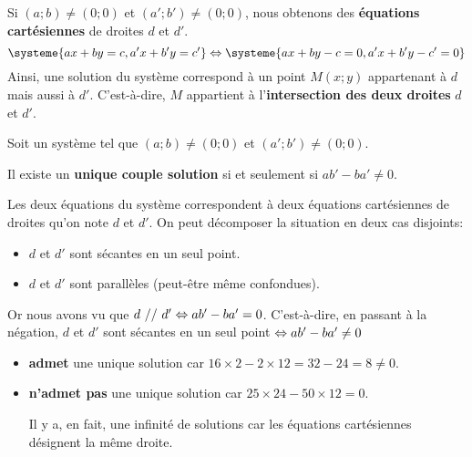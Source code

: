 \documentclass[cours,couleur]{mathsRC}
\begin{document}
\begin{remarque}
Si $(a;b)\neq(0;0)$ et $(a';b')\neq(0;0)$, nous obtenons des \textbf{équations cartésiennes} de droites $d$ et $d'$.
\[
\systeme{ax+by=c,a'x+b'y=c'} \ssi \systeme{ax+by-c=0,a'x+b'y-c'=0}
\]
Ainsi, une solution du système correspond à un point $M(x;y)$ appartenant à $d$ mais aussi à $d'$. C'est-à-dire, $M$ appartient à l'\textbf{intersection des deux droites} $d$ et $d'$.
\end{remarque}

\begin{propriete}
Soit un système  tel que $(a;b)\neq(0;0)$ et $(a';b')\neq(0;0)$.

Il existe un \textbf{unique couple solution} si et seulement si $ab'-ba'\neq0$.
\end{propriete}

\begin{demonstration}
Les deux équations du système correspondent à deux équations cartésiennes de droites qu'on note $d$ et $d'$. On peut décomposer la situation en deux cas disjoints:
\begin{itemize}
\item
$d$ et $d'$ sont sécantes en un seul point.
\item
$d$ et $d'$ sont parallèles (peut-être même confondues).
\end{itemize}
Or nous avons vu que $d\ //\ d' \Leftrightarrow ab'-ba'=0$. C'est-à-dire, en passant à la négation, $d$ et $d'$ sont sécantes en un seul point $\Leftrightarrow ab'-ba'\neq 0$
\end{demonstration}

\begin{exemples}
\begin{itemize}[leftmargin=*]
\item
{} \textbf{admet} une unique solution car $16\times 2 -2\times12=32-24=8\neq 0$.
\item
{} \textbf{n'admet pas} une unique solution car $25\times 24 -50\times12=0$.

Il y a, en fait, une infinité de solutions car les équations cartésiennes désignent la même droite.
\end{itemize}
\end{exemples}
\end{document}
